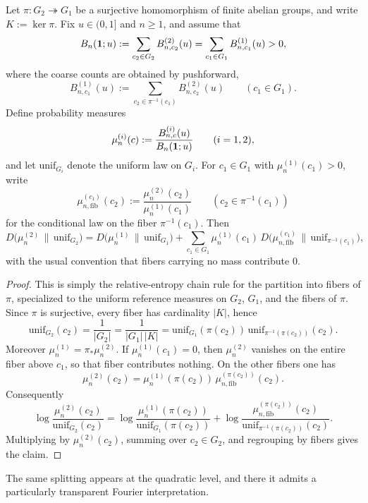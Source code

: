 \begin{proposition}\label{thm:kernel-chebotarev-quotient-relative-entropy-chain}
Let \(\pi:G_2\twoheadrightarrow G_1\) be a surjective homomorphism of finite abelian groups, and write \(K:=\ker \pi\). Fix \(u\in(0,1]\) and \(n\ge 1\), and assume that
\[
B_n(\mathbf{1};u):=
\sum_{c_2\in G_2}B^{(2)}_{n,c_2}(u)
=
\sum_{c_1\in G_1}B^{(1)}_{n,c_1}(u)
>0,
\]
where the coarse counts are obtained by pushforward,
\[
B^{(1)}_{n,c_1}(u):=
\sum_{c_2\in\pi^{-1}(c_1)}B^{(2)}_{n,c_2}(u)
\qquad(c_1\in G_1).
\]
Define probability measures
\[
\mu_n^{(i)}(c):=\frac{B^{(i)}_{n,c}(u)}{B_n(\mathbf{1};u)}
\qquad(i=1,2),
\]
and let \(\mathrm{unif}_{G_i}\) denote the uniform law on \(G_i\). For \(c_1\in G_1\) with \(\mu_n^{(1)}(c_1)>0\), write
\[
\mu_{n,\mathrm{fib}}^{(c_1)}(c_2):=
\frac{\mu_n^{(2)}(c_2)}{\mu_n^{(1)}(c_1)}
\qquad(c_2\in\pi^{-1}(c_1))
\]
for the conditional law on the fiber \(\pi^{-1}(c_1)\). Then
\[
D\!\bigl(\mu_n^{(2)}\,\|\,\mathrm{unif}_{G_2}\bigr)
=
D\!\bigl(\mu_n^{(1)}\,\|\,\mathrm{unif}_{G_1}\bigr)
+
\sum_{c_1\in G_1}\mu_n^{(1)}(c_1)\,
D\!\bigl(\mu_{n,\mathrm{fib}}^{(c_1)}\,\|\,\mathrm{unif}_{\pi^{-1}(c_1)}\bigr),
\]
with the usual convention that fibers carrying no mass contribute \(0\).
\end{proposition}

\begin{proof}
This is simply the relative-entropy chain rule for the partition into fibers of \(\pi\), specialized to the uniform reference measures on \(G_2\), \(G_1\), and the fibers of \(\pi\). Since \(\pi\) is surjective, every fiber has cardinality \(|K|\), hence
\[
\mathrm{unif}_{G_2}(c_2)
=
\frac{1}{|G_2|}
=
\frac{1}{|G_1|\,|K|}
=
\mathrm{unif}_{G_1}(\pi(c_2))\,\mathrm{unif}_{\pi^{-1}(\pi(c_2))}(c_2).
\]
Moreover \(\mu_n^{(1)}=\pi_\ast\mu_n^{(2)}\). If \(\mu_n^{(1)}(c_1)=0\), then \(\mu_n^{(2)}\) vanishes on the entire fiber above \(c_1\), so that fiber contributes nothing. On the other fibers one has
\[
\mu_n^{(2)}(c_2)
=
\mu_n^{(1)}(\pi(c_2))\,\mu_{n,\mathrm{fib}}^{(\pi(c_2))}(c_2).
\]
Consequently
\[
\log \frac{\mu_n^{(2)}(c_2)}{\mathrm{unif}_{G_2}(c_2)}
=
\log \frac{\mu_n^{(1)}(\pi(c_2))}{\mathrm{unif}_{G_1}(\pi(c_2))}
+
\log \frac{\mu_{n,\mathrm{fib}}^{(\pi(c_2))}(c_2)}{\mathrm{unif}_{\pi^{-1}(\pi(c_2))}(c_2)}.
\]
Multiplying by \(\mu_n^{(2)}(c_2)\), summing over \(c_2\in G_2\), and regrouping by fibers gives the claim.
\end{proof}

The same splitting appears at the quadratic level, and there it admits a particularly transparent Fourier interpretation.

